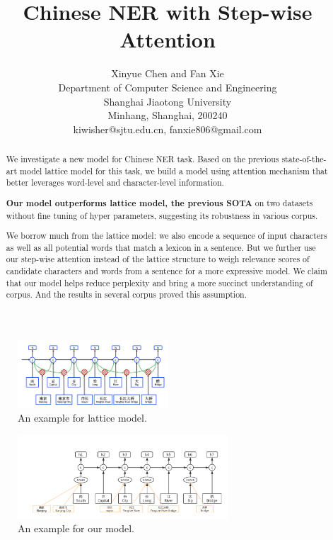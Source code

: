 \documentclass[letterpaper]{article} %
\begin{document}
%
\title{Chinese NER with Step-wise Attention}
\author{Xinyue Chen and Fan Xie\\Department of Computer Science and Engineering\\
Shanghai Jiaotong University \\
Minhang, Shanghai, 200240 
\\
kiwisher@sjtu.edu.cn,
fanxie806@gmail.com
}
\maketitle

\begin{abstract}
We investigate a new model for Chinese NER task. Based on the previous state-of-the-art model lattice model for this task, we build a model using attention mechanism that better leverages word-level and character-level information.

\textbf{Our model outperforms lattice model, the previous SOTA} on two datasets without fine tuning of hyper parameters, suggesting its robustness in various corpus.

We borrow much from the lattice model: we also encode a sequence of input characters as well as all potential words that match a lexicon in a sentence. But we further use our step-wise attention instead of the lattice structure to weigh relevance scores of candidate characters and words from a sentence for a more expressive model. We claim that our model helps reduce perplexity and bring a more succinct understanding of corpus. And the results in several corpus proved this assumption.


\end{abstract}

\begin{figure}
\label{fig:lattice}
\centering
\includegraphics[width=0.5\textwidth]{lattice.png}
\caption{An example for lattice model.}
\end{figure}

\begin{figure}
\label{fig:our}
\centering
\includegraphics[width=0.7\textwidth]{our.png}
\caption{An example for our model.}
\end{figure}
\end{document}
